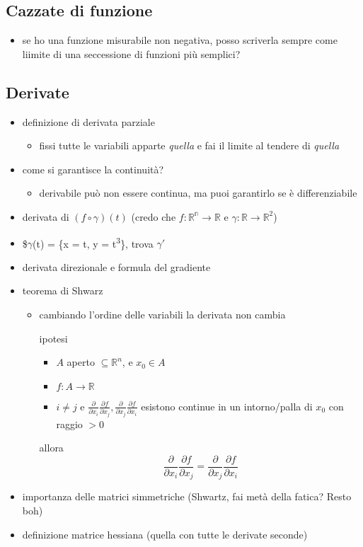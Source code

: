 \documentclass[11pt]{article}
\begin{document}
\subsection{Cazzate di funzione}
\label{sec:org1f15983}
\begin{itemize}
\item se ho una funzione misurabile non negativa, posso scriverla sempre come liimite di una
seccessione di funzioni più semplici?
\end{itemize}

\subsection{Derivate}
\label{sec:org21f4db1}
\begin{itemize}
\item definizione di derivata parziale
\begin{itemize}
\item fissi tutte le variabili apparte \emph{quella} e fai il limite al tendere di \emph{quella}
\end{itemize}
\item come si garantisce la continuità?
\begin{itemize}
\item derivabile può non essere continua, ma puoi garantirlo se è differenziabile
\end{itemize}
\item derivata di \((f \circ \gamma) (t)\) (credo che
\(f : \mathbb{R^n} \to \mathbb{R}\) e
\(\gamma : \mathbb{R} \to \mathbb{R}^2\))
\item \$\(\gamma\)(t) = \{x = t, y = t\textsuperscript{3}\}, trova \(\gamma '\)
\item derivata direzionale e formula del gradiente
\item teorema di Shwarz
\begin{itemize}
\item cambiando l'ordine delle variabili la derivata non cambia
\item[{ipotesi}] \begin{itemize}
\item \(A\) aperto \(\subseteq \mathbb{R}^n\), e \(x_0 \in A\)
\item \(f : A \to \mathbb{R}\)
\item \(i \neq j\) e
\(\frac{\partial}{\partial x_i}\frac{\partial f}{\partial x_j},
         \frac{\partial}{\partial x_j}\frac{\partial f}{\partial x_i}\)
esistono continue in un intorno/palla di \(x_0\) con raggio \(> 0\)
\end{itemize}
\item[{allora}] \[
     \frac{\partial}{\partial x_i} \frac{\partial f}{\partial x_j} =
     \frac{\partial}{\partial x_j} \frac{\partial f}{\partial x_i}
     \]
\end{itemize}
\item importanza delle matrici simmetriche (Shwartz, fai metà della fatica? Resto boh)
\item definizione matrice hessiana
(quella con tutte le derivate seconde)
\end{itemize}
\end{document}
